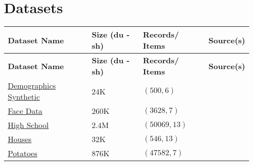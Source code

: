 \chapter{Datasets}\label{Datasets}



\begin{customArrayStretch}{1.3}
\begin{longtable}{
    |p{4cm}| %
    >{\hfill}p{2.1cm}| %
    >{\hfill}p{2.5cm}| %
    p{2cm}| %
}

\hline
    \textbf{Dataset Name} & 
    \textbf{Size (du -sh)} & 
    \textbf{Records/ Items} & 
    \textbf{Source(s)} \\
\hline
\endfirsthead

\hline
    \textbf{Dataset Name} & 
    \textbf{Size (du -sh)} & 
    \textbf{Records/ Items} & 
    \textbf{Source(s)} \\
\hline
\endhead

\hline \endfoot
\hline \endlastfoot




\href{http://www.nth-iteration.com/wp-content/uploads/2018/08/demographics-synthetic.csv}{Demographics Synthetic} \label{Datasets/nth-iteration/demographics-synthetic} & 
$24$K &
$(500, 6)$ & 
\cite{statistics/book/Statistics-for-Data-Scientists/Maurits-Kaptein} \\ \hline

\href{http://www.nth-iteration.com/wp-content/uploads/2018/08/face-data.csv}{Face Data} \label{Datasets/nth-iteration/face-data} & 
$260$K &
$(3628, 7)$ & 
\cite{statistics/book/Statistics-for-Data-Scientists/Maurits-Kaptein} \\ \hline

\href{http://www.nth-iteration.com/wp-content/uploads/2018/08/high-school.csv}{High School} \label{Datasets/nth-iteration/high-school} & 
$2.4$M &
$(50069, 13)$ & 
\cite{statistics/book/Statistics-for-Data-Scientists/Maurits-Kaptein} \\ \hline

\href{http://www.nth-iteration.com/wp-content/uploads/2018/08/houses.csv}{Houses} \label{Datasets/nth-iteration/houses} & 
$32$K &
$(546, 13)$ & 
\cite{statistics/book/Statistics-for-Data-Scientists/Maurits-Kaptein} \\ \hline

\href{https://drive.google.com/file/d/1GYUk0i9penKnSWODDkZfMzNxK2FUxDi8/view?usp=drive_link}{Potatoes} \label{Datasets/nth-iteration/potatoes} & 
$876$K &
$(47582, 7)$ & 
\cite{statistics/book/Statistics-for-Data-Scientists/Maurits-Kaptein} \\ \hline


\end{longtable}
\end{customArrayStretch}
